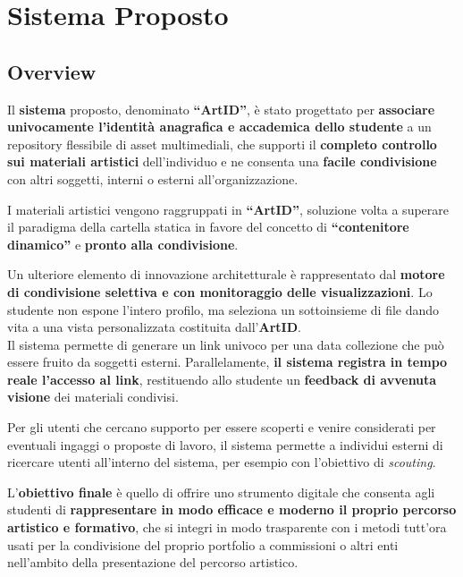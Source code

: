 \section{Sistema Proposto}

\subsection{Overview}
Il \textbf{sistema} proposto, denominato \textbf{``ArtID''}, è stato progettato per \textbf{associare univocamente l'identit\`a anagrafica e accademica dello studente} a un repository flessibile di asset multimediali, che supporti il \textbf{completo controllo sui materiali artistici} dell'individuo e ne consenta una \textbf{facile condivisione} con altri soggetti, interni o esterni all'organizzazione.

I materiali artistici vengono raggruppati in \textbf{``ArtID''}, soluzione volta a superare il paradigma della cartella statica in favore del concetto di \textbf{``contenitore dinamico''} e \textbf{pronto alla condivisione}.

Un ulteriore elemento di innovazione architetturale \`e rappresentato dal \textbf{motore di condivisione selettiva e con monitoraggio delle visualizzazioni}.
Lo studente non espone l'intero profilo, ma seleziona un sottoinsieme di file dando vita a una vista personalizzata costituita dall'\textbf{ArtID}.\\
Il sistema permette di generare un link univoco per una data collezione che pu\`o essere fruito da soggetti esterni.
Parallelamente, \textbf{il sistema registra in tempo reale l'accesso al link}, restituendo allo studente un \textbf{feedback di avvenuta visione} dei materiali condivisi.

Per gli utenti che cercano supporto per essere scoperti e venire considerati per eventuali ingaggi o proposte di lavoro, il sistema permette a individui esterni di ricercare utenti all'interno del sistema, per esempio con l'obiettivo di \textit{scouting}.

L'\textbf{obiettivo finale} è quello di offrire uno strumento digitale che consenta agli studenti di \textbf{rappresentare in modo efficace e moderno il proprio percorso artistico e formativo}, che si integri in modo trasparente con i metodi tutt'ora usati per la condivisione del proprio portfolio a commissioni o altri enti nell'ambito della presentazione del percorso artistico.

